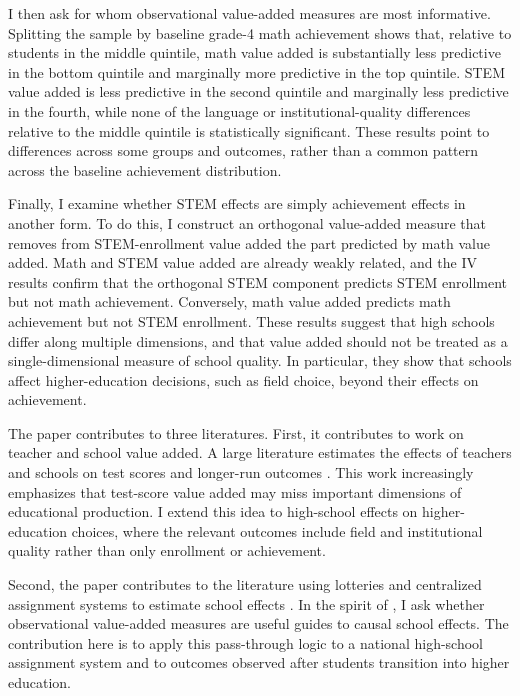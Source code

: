 \documentclass[a4paper, article, english, oneside, unknownkeysallowed, 12pt]{memoir}
\begin{document}
I then ask for whom observational value-added measures are most informative.
Splitting the sample by baseline grade-4 math achievement shows that, relative to students in the middle quintile, math value added is substantially less predictive in the bottom quintile and marginally more predictive in the top quintile.
STEM value added is less predictive in the second quintile and marginally less predictive in the fourth, while none of the language or institutional-quality differences relative to the middle quintile is statistically significant.
These results point to differences across some groups and outcomes, rather than a common pattern across the baseline achievement distribution.


Finally, I examine whether STEM effects are simply achievement effects in another form.
To do this, I construct an orthogonal value-added measure that removes from STEM-enrollment value added the part predicted by math value added.
Math and STEM value added are already weakly related, and the IV results confirm that the orthogonal STEM component predicts STEM enrollment but not math achievement.
Conversely, math value added predicts math achievement but not STEM enrollment.
These results suggest that high schools differ along multiple dimensions, and that value added should not be treated as a single-dimensional measure of school quality.
In particular, they show that schools affect higher-education decisions, such as field choice, beyond their effects on achievement.

The paper contributes to three literatures.
First, it contributes to work on teacher and school value added.
A large literature estimates the effects of teachers and schools on test scores and longer-run outcomes \parencite{chetty_measuring_2014, dobbie_medium-term_2015, jackson_what_2018, beuermann_what_2023, rose_effects_2022}.
This work increasingly emphasizes that test-score value added may miss important dimensions of educational production.
I extend this idea to high-school effects on higher-education choices, where the relevant outcomes include field and institutional quality rather than only enrollment or achievement.

Second, the paper contributes to the literature using lotteries and centralized assignment systems to estimate school effects \parencite{abdulkadiroglu_elite_2014, abdulkadiroglu_research_2017, angrist_credible_2024}.
In the spirit of \textcite{angrist_leveraging_2017}, I ask whether observational value-added measures are useful guides to causal school effects.
The contribution here is to apply this pass-through logic to a national high-school assignment system and to outcomes observed after students transition into higher education.
\end{document}
